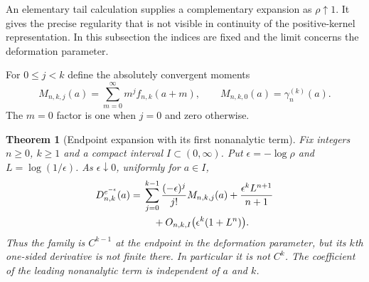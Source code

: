 \documentclass[11pt,letterpaper]{article}
\numberwithin{equation}{section}
\theoremstyle{plain}
\newtheorem{theorem}{Theorem}[section]
\theoremstyle{definition}
\theoremstyle{remark}
\begin{document}
An elementary tail calculation supplies a complementary expansion as
$\rho\uparrow1$. It gives the precise regularity that is not visible
in continuity of the positive-kernel representation. In this subsection
the indices are fixed and the limit concerns the deformation parameter.

For $0\leq j<k$ define the absolutely convergent moments
\begin{equation}\label{cont26:eq:bif-weighted-moments}
 M_{n,k,j}(a)=\sum_{m=0}^{\infty}m^j f_{n,k}(a+m),
 \qquad M_{n,k,0}(a)=\gamma_n^{(k)}(a).
\end{equation}
The $m=0$ factor is one when $j=0$ and zero otherwise.

\begin{theorem}[Endpoint expansion with its first nonanalytic term]
\label{cont26:thm:bif-rho-one}
Fix integers $n\geq0$, $k\geq1$ and a compact interval
$I\subset(0,\infty)$. Put $\epsilon=-\log\rho$ and
$L=\log(1/\epsilon)$. As $\epsilon\downarrow0$, uniformly for $a\in I$,
\begin{align}\label{cont26:eq:bif-rho-one}
 D_{n,k}^{e^{-\epsilon}}(a)
  ={}&\sum_{j=0}^{k-1}\frac{(-\epsilon)^j}{j!}M_{n,k,j}(a)
       +\frac{\epsilon^k L^{n+1}}{n+1}\\
     &\quad+O_{n,k,I}\bigl(\epsilon^k(1+L^n)\bigr).\notag
\end{align}
Thus the family is $C^{k-1}$ at the endpoint in the deformation
parameter, but its $k$th one-sided derivative is not finite there.
In particular it is not $C^k$. The coefficient of the leading
nonanalytic term is independent of $a$ and $k$.
\end{theorem}
\end{document}
